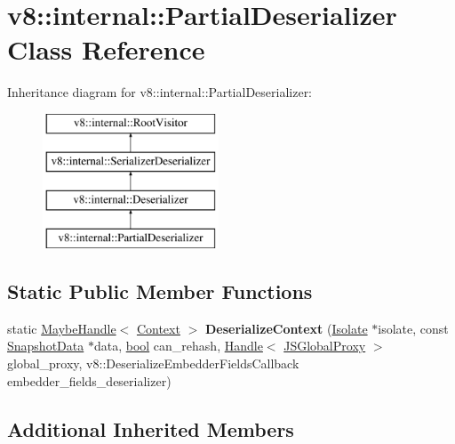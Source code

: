 \hypertarget{classv8_1_1internal_1_1PartialDeserializer}{}\section{v8\+:\+:internal\+:\+:Partial\+Deserializer Class Reference}
\label{classv8_1_1internal_1_1PartialDeserializer}
Inheritance diagram for v8\+:\+:internal\+:\+:Partial\+Deserializer\+:\begin{figure}[H]
\begin{center}
\leavevmode
\includegraphics[height=4.000000cm]{classv8_1_1internal_1_1PartialDeserializer}
\end{center}
\end{figure}
\subsection*{Static Public Member Functions}
\begin{DoxyCompactItemize}
\item 
\mbox{\label{classv8_1_1internal_1_1PartialDeserializer_a060fdd27e6222f5951227840a24afcdf}} 
static \mbox{\hyperlink{classv8_1_1internal_1_1MaybeHandle}{Maybe\+Handle}}$<$ \mbox{\hyperlink{classv8_1_1internal_1_1Context}{Context}} $>$ {\bfseries Deserialize\+Context} (\mbox{\hyperlink{classv8_1_1internal_1_1Isolate}{Isolate}} $\ast$isolate, const \mbox{\hyperlink{classv8_1_1internal_1_1SnapshotData}{Snapshot\+Data}} $\ast$data, \mbox{\hyperlink{classbool}{bool}} can\+\_\+rehash, \mbox{\hyperlink{classv8_1_1internal_1_1Handle}{Handle}}$<$ \mbox{\hyperlink{classv8_1_1internal_1_1JSGlobalProxy}{J\+S\+Global\+Proxy}} $>$ global\+\_\+proxy, v8\+::\+Deserialize\+Embedder\+Fields\+Callback embedder\+\_\+fields\+\_\+deserializer)
\end{DoxyCompactItemize}
\subsection*{Additional Inherited Members}


